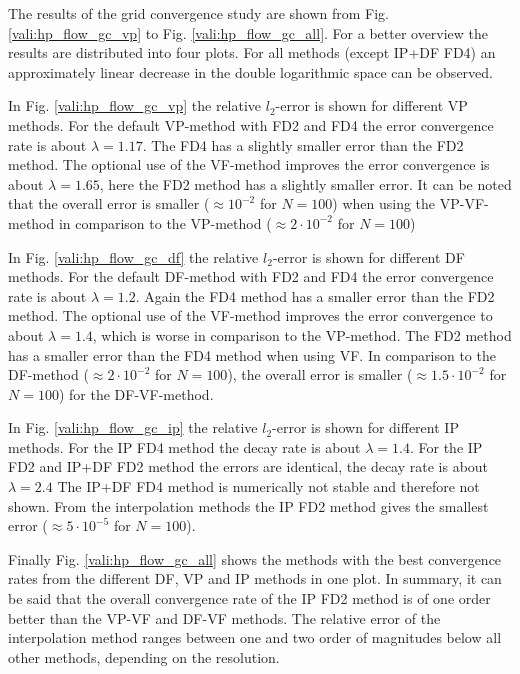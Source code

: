 The results of the grid convergence study are shown from Fig. \ref{vali:hp_flow_gc_vp} to Fig. \ref{vali:hp_flow_gc_all}.
For a better overview the results are distributed into four plots.
For all methods (except IP+DF FD4) an approximately linear decrease in the double logarithmic space can be observed.

In Fig. \ref{vali:hp_flow_gc_vp} the relative $l_2$-error is shown for different VP methods.
For the default VP-method with FD2 and FD4 the error convergence rate is about $\lambda=1.17$.
The FD4 has a slightly smaller error than the FD2 method.
The optional use of the VF-method improves the error convergence is about $\lambda=1.65$,
here the FD2 method has a slightly smaller error.
It can be noted that the overall error is smaller ($\approx 10^{-2}$ for $N=100$)
when using the VP-VF-method in comparison to the VP-method ($\approx2\cdot 10^{-2}$ for $N=100$)

In Fig. \ref{vali:hp_flow_gc_df} the relative $l_2$-error is shown for different DF methods.
For the default DF-method with FD2 and FD4 the error convergence rate is about $\lambda=1.2$.
Again the FD4 method has a smaller error than the FD2 method.
The optional use of the VF-method improves the error convergence to about $\lambda=1.4$,
which is worse in comparison to the VP-method. The FD2 method has a smaller error than the FD4 method when using VF.
In comparison to the DF-method ($\approx2\cdot 10^{-2}$ for $N=100$),
the overall error is smaller ($\approx 1.5 \cdot 10^{-2}$ for $N=100$) for the DF-VF-method.

In Fig. \ref{vali:hp_flow_gc_ip} the relative $l_2$-error is shown for different IP methods.
For the IP FD4 method the decay rate is about $\lambda=1.4$.
For the IP FD2 and IP+DF FD2 method the errors are identical, the decay rate is about $\lambda=2.4$
The IP+DF FD4 method is numerically not stable and therefore not shown.
From the interpolation methods the IP FD2 method gives the smallest error  ($\approx 5 \cdot 10^{-5}$ for $N=100$).

Finally Fig. \ref{vali:hp_flow_gc_all} shows the methods  with the best convergence
rates from the different DF, VP and IP methods in one plot.
In summary, it can be said that the overall convergence rate of the IP FD2 method is of one order better
than the VP-VF and DF-VF methods. The relative error of the interpolation method ranges
between one and two order of magnitudes below all other methods, depending on the resolution.

